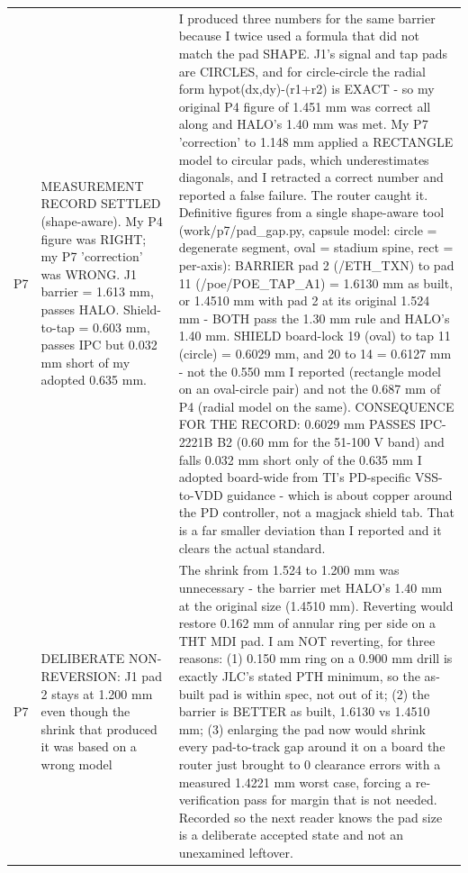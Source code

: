 \documentclass[11pt,a4paper]{article}
\begin{document}
{\begin{longtable}{lp{5.2cm}p{7.2cm}}
P7 & MEASUREMENT RECORD SETTLED (shape-aware). My P4 figure was RIGHT; my P7 'correction' was WRONG. J1 barrier = 1.613 mm, passes HALO. Shield-to-tap = 0.603 mm, passes IPC but 0.032 mm short of my adopted 0.635 mm. & I produced three numbers for the same barrier because I twice used a formula that did not match the pad SHAPE. J1's signal and tap pads are CIRCLES, and for circle-circle the radial form hypot(dx,dy)-(r1+r2) is EXACT - so my original P4 figure of 1.451 mm was correct all along and HALO's 1.40 mm was met. My P7 'correction' to 1.148 mm applied a RECTANGLE model to circular pads, which underestimates diagonals, and I retracted a correct number and reported a false failure. The router caught it. Definitive figures from a single shape-aware tool (work/p7/pad\_gap.py, capsule model: circle = degenerate segment, oval = stadium spine, rect = per-axis): BARRIER pad 2 (/ETH\_TXN) to pad 11 (/poe/POE\_TAP\_A1) = 1.6130 mm as built, or 1.4510 mm with pad 2 at its original 1.524 mm - BOTH pass the 1.30 mm rule and HALO's 1.40 mm. SHIELD board-lock 19 (oval) to tap 11 (circle) = 0.6029 mm, and 20 to 14 = 0.6127 mm - not the 0.550 mm I reported (rectangle model on an oval-circle pair) and not the 0.687 mm of P4 (radial model on the same). CONSEQUENCE FOR THE RECORD: 0.6029 mm PASSES IPC-2221B B2 (0.60 mm for the 51-100 V band) and falls 0.032 mm short only of the 0.635 mm I adopted board-wide from TI's PD-specific VSS-to-VDD guidance - which is about copper around the PD controller, not a magjack shield tab. That is a far smaller deviation than I reported and it clears the actual standard. \\
P7 & DELIBERATE NON-REVERSION: J1 pad 2 stays at 1.200 mm even though the shrink that produced it was based on a wrong model & The shrink from 1.524 to 1.200 mm was unnecessary - the barrier met HALO's 1.40 mm at the original size (1.4510 mm). Reverting would restore 0.162 mm of annular ring per side on a THT MDI pad. I am NOT reverting, for three reasons: (1) 0.150 mm ring on a 0.900 mm drill is exactly JLC's stated PTH minimum, so the as-built pad is within spec, not out of it; (2) the barrier is BETTER as built, 1.6130 vs 1.4510 mm; (3) enlarging the pad now would shrink every pad-to-track gap around it on a board the router just brought to 0 clearance errors with a measured 1.4221 mm worst case, forcing a re-verification pass for margin that is not needed. Recorded so the next reader knows the pad size is a deliberate accepted state and not an unexamined leftover. \\

\end{longtable}}
\end{document}

